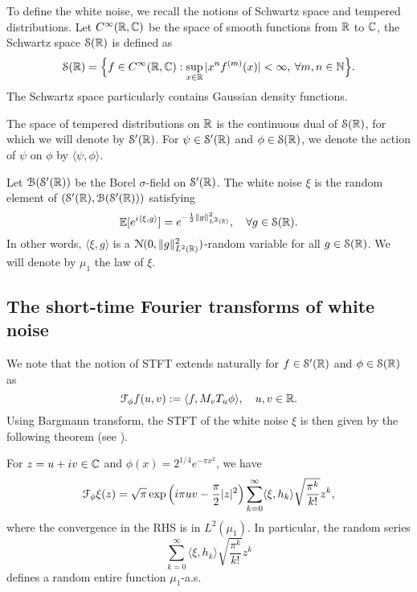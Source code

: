 To define the white noise, we recall the notions of Schwartz space and tempered distributions. Let $C^\infty(\mathbb{R},\mathbb{C})$ be the space of smooth functions from $\mathbb{R}$ to $\mathbb{C}$, the Schwartz space $\mathcal{S}(\mathbb{R})$ is defined as
\[ \mathcal{S}(\mathbb{R}) = \Big \{ f \in C^\infty(\mathbb{R}, \mathbb{C}) : \sup_{x\in \mathbb{R}} |x^n f^{(m)}(x)| < \infty, \: \forall m,n \in \mathbb{N} \Big \}.\]
The Schwartz space particularly contains Gaussian density functions.

The space of tempered distributions on $\mathbb{R}$ is the continuous dual of $\mathcal{S}(\mathbb{R})$, for which we will denote by $\mathcal{S}'(\mathbb{R})$. For $\psi \in \mathcal{S}'(\mathbb{R})$ and $\phi\in \mathcal{S}(\mathbb{R})$, we denote the action of $\psi$ on $\phi$ by $\langle \psi , \phi \rangle $.

\begin{definition}
Let $\mathcal B(\mathcal{S}'(\mathbb{R}))$ be the Borel $\sigma$-field on $\mathcal{S}'(\mathbb{R})$. The white noise $\xi$ is the random element of $(\mathcal{S}'(\mathbb{R}), \mathcal B(\mathcal{S}'(\mathbb{R})))$ satisfying
\[ \mathbb{E}[e^{i\langle \xi, g \rangle } ] = e^{-\frac{1}{2} \|g\|^2_{L^2(\mathbb{R})}}, \quad \forall g\in \mathcal{S}(\mathbb{R}). \]
In other words, $\langle \xi ,g \rangle$ is a $\mathcal N(0,\|g\|_{L^2(\mathbb{R})}^2)$-random variable for all $g\in \mathcal{S}(\mathbb{R})$. We will denote by $\mu_1$ the law of $\xi$.
\end{definition}

\subsection{The short-time Fourier transforms of white noise}

We note that the notion of STFT extends naturally for $f\in \mathcal{S}'(\mathbb{R})$ and $\phi \in \mathcal{S}(\mathbb{R})$ as
\[ \mathcal{F}_\phi f(u,v ) := \langle f , M_v T_u \phi \rangle , \quad u,v\in \mathbb{R}.\]
Using Bargmann transform, the STFT of the white noise $\xi$ is then given by the following theorem (see \cite{BARDENET_Spec, GhoshGAF}).
\begin{theorem} \label{p:whitenoise}
For $z= u+iv \in \mathbb{C}$ and $\phi (x) = 2^{1/4}e^{-\pi x^2}$, we have
\begin{equation} \label{eq:stft_whitenoise}
\mathcal{F}_\phi \xi (z) = \sqrt{\pi} \exp\Big (i\pi uv - \frac{\pi}{2}|z|^2 \Big ) \sum_{k=0}^\infty \langle \xi, h_k \rangle \sqrt{\frac{\pi^k}{k!}} z^k,
\end{equation}
where the convergence in the RHS is in $L^2(\mu_1)$. In particular, the random series
\[ \sum_{k=0}^\infty \langle \xi, h_k \rangle  \sqrt{\frac{\pi^k}{k!}} z^k\]
defines a random entire function $\mu_1$-a.s.
\end{theorem}

